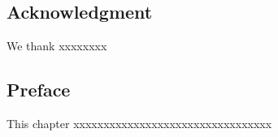 \begin{frontchapter}

\begin{frontmatter}
\chapter*{Acknowledgment}
\makechaptertitle
\end{frontmatter}
We thank xxxxxxxx


\end{frontchapter}

 

\begin{frontchapter}

\begin{frontmatter}
\chapter*{Preface}
\makechaptertitle
\end{frontmatter}



This chapter xxxxxxxxxxxxxxxxxxxxxxxxxxxxxxxxx




\end{frontchapter}






